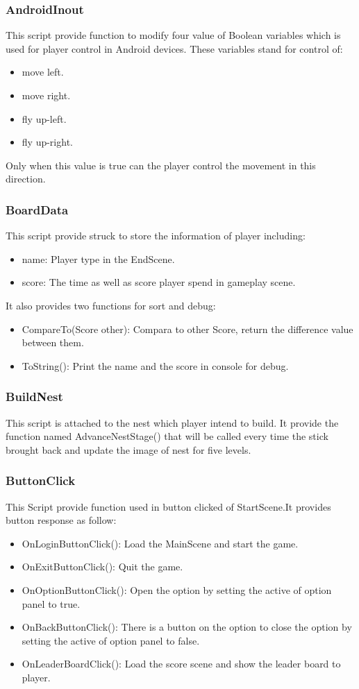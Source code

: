 \documentclass[12pt]{article}
\begin{document}
\subsubsection{AndroidInout}
This script provide function to modify four value of Boolean variables which is used for player control in Android devices. These variables stand for control of:
\begin{itemize}
\item move left.
\item move right.
\item fly up-left.
\item fly up-right.
\end{itemize}
Only when this value is true can the player control the movement in this direction.

\subsubsection{BoardData}
This script provide struck to store the information of player including:
\begin{itemize}
\item name: Player type in the EndScene.
\item score: The time as well as score player spend in gameplay scene.
\end{itemize}
It also provides two functions for sort and debug:
\begin{itemize}
\item CompareTo(Score other): Compara to other Score, return the difference value between them.
\item ToString(): Print the name and the score in console for debug.
\end{itemize}

\subsubsection{BuildNest}
This script is attached to the nest which player intend to build. It provide the function named AdvanceNestStage() that will be called every time the stick brought back and update the image of nest for five levels.

\subsubsection{ButtonClick}
This Script provide function used in button clicked of StartScene.It provides button response as follow:
\begin{itemize}
\item OnLoginButtonClick(): Load the MainScene and start the game.
\item OnExitButtonClick(): Quit the game.
\item OnOptionButtonClick(): Open the option by setting the active of option panel to true.
\item OnBackButtonClick(): There is a button on the option to close the option by setting the active of option panel to false.
\item OnLeaderBoardClick(): Load the score scene and show the leader board to player.
\end{itemize}
\end{document}
